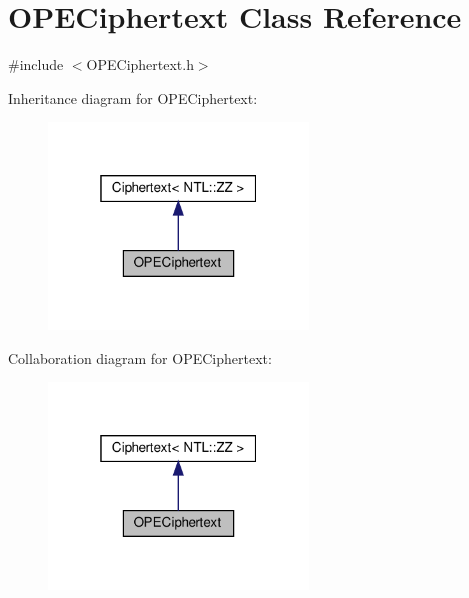 \hypertarget{classOPECiphertext}{}\section{O\+P\+E\+Ciphertext Class Reference}
\label{classOPECiphertext}


{\ttfamily \#include $<$O\+P\+E\+Ciphertext.\+h$>$}



Inheritance diagram for O\+P\+E\+Ciphertext\+:
\nopagebreak
\begin{figure}[H]
\begin{center}
\leavevmode
\includegraphics[width=196pt]{classOPECiphertext__inherit__graph}
\end{center}
\end{figure}


Collaboration diagram for O\+P\+E\+Ciphertext\+:
\nopagebreak
\begin{figure}[H]
\begin{center}
\leavevmode
\includegraphics[width=196pt]{classOPECiphertext__coll__graph}
\end{center}
\end{figure}
